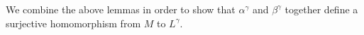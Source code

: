 \documentclass[../paper.tex]{subfiles}
\begin{document}


We combine the above lemmas in order to show that $\alpha^{\gamma}$ and
$\beta^{\gamma}$ together define a surjective homomorphism from $M$ to
$L^{\gamma}$.
\end{document}
